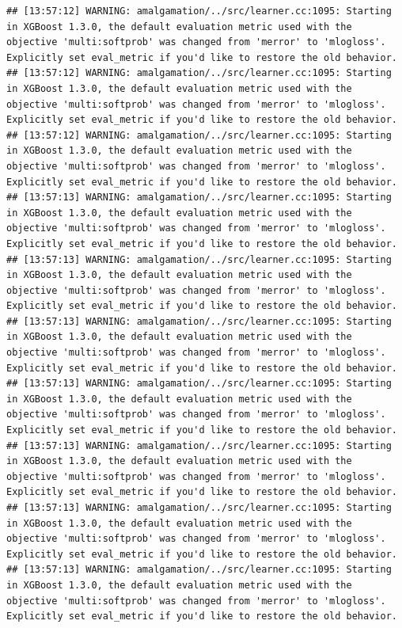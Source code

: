 \documentclass[
]{scrbook}
\begin{document}
\begin{verbatim}
## [13:57:12] WARNING: amalgamation/../src/learner.cc:1095: Starting in XGBoost 1.3.0, the default evaluation metric used with the objective 'multi:softprob' was changed from 'merror' to 'mlogloss'. Explicitly set eval_metric if you'd like to restore the old behavior.
## [13:57:12] WARNING: amalgamation/../src/learner.cc:1095: Starting in XGBoost 1.3.0, the default evaluation metric used with the objective 'multi:softprob' was changed from 'merror' to 'mlogloss'. Explicitly set eval_metric if you'd like to restore the old behavior.
## [13:57:12] WARNING: amalgamation/../src/learner.cc:1095: Starting in XGBoost 1.3.0, the default evaluation metric used with the objective 'multi:softprob' was changed from 'merror' to 'mlogloss'. Explicitly set eval_metric if you'd like to restore the old behavior.
## [13:57:13] WARNING: amalgamation/../src/learner.cc:1095: Starting in XGBoost 1.3.0, the default evaluation metric used with the objective 'multi:softprob' was changed from 'merror' to 'mlogloss'. Explicitly set eval_metric if you'd like to restore the old behavior.
## [13:57:13] WARNING: amalgamation/../src/learner.cc:1095: Starting in XGBoost 1.3.0, the default evaluation metric used with the objective 'multi:softprob' was changed from 'merror' to 'mlogloss'. Explicitly set eval_metric if you'd like to restore the old behavior.
## [13:57:13] WARNING: amalgamation/../src/learner.cc:1095: Starting in XGBoost 1.3.0, the default evaluation metric used with the objective 'multi:softprob' was changed from 'merror' to 'mlogloss'. Explicitly set eval_metric if you'd like to restore the old behavior.
## [13:57:13] WARNING: amalgamation/../src/learner.cc:1095: Starting in XGBoost 1.3.0, the default evaluation metric used with the objective 'multi:softprob' was changed from 'merror' to 'mlogloss'. Explicitly set eval_metric if you'd like to restore the old behavior.
## [13:57:13] WARNING: amalgamation/../src/learner.cc:1095: Starting in XGBoost 1.3.0, the default evaluation metric used with the objective 'multi:softprob' was changed from 'merror' to 'mlogloss'. Explicitly set eval_metric if you'd like to restore the old behavior.
## [13:57:13] WARNING: amalgamation/../src/learner.cc:1095: Starting in XGBoost 1.3.0, the default evaluation metric used with the objective 'multi:softprob' was changed from 'merror' to 'mlogloss'. Explicitly set eval_metric if you'd like to restore the old behavior.
## [13:57:13] WARNING: amalgamation/../src/learner.cc:1095: Starting in XGBoost 1.3.0, the default evaluation metric used with the objective 'multi:softprob' was changed from 'merror' to 'mlogloss'. Explicitly set eval_metric if you'd like to restore the old behavior.

\end{verbatim}
\end{document}
